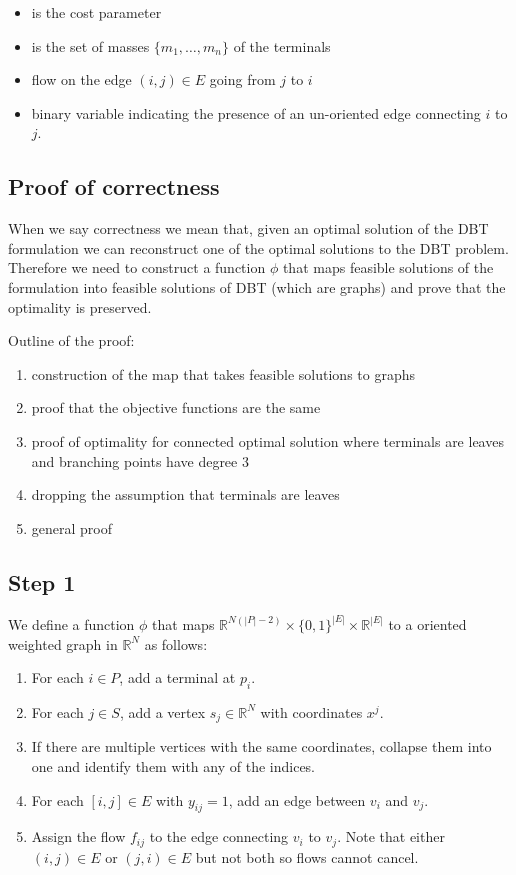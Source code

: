 \documentclass[11pt,reqno,a4paper]{amsart}
\newenvironment{itemizeb}
{\begin{itemize}
     \itemsep=2pt}{
\end{itemize}}
\numberwithin{equation}{section}
\theoremstyle{mytheorem}
\theoremstyle{myremark}
\theoremstyle{myparagraph}
\newcommand{\R}{\mathbb{R}}
\begin{document}
    \begin{itemizeb}
         cm=.3 cm
        \item[$\alpha \in (0,1)$] is the cost parameter
        \item [$M$] is the set of masses $\{m_1, \ldots, m_n\}$ of the terminals
        \item [$f_{ij}$] flow on the edge $(i, j) \in E$ going from $j$ to $i$
        \item [$y_{ij}$] binary variable indicating the presence of an un-oriented edge connecting $i$ to $j$.
    \end{itemizeb}

    \subsection{Proof of correctness}

    When we say correctness we mean that, given an optimal solution of the DBT formulation we can reconstruct one of the optimal solutions
    to the DBT problem.
    Therefore we need to construct a function $\phi$ that maps feasible solutions of the formulation into feasible solutions of DBT (which are graphs)
    and prove that the optimality is preserved.

    Outline of the proof:
    \begin{enumerate}
        \item construction of the map that takes feasible solutions to graphs
        \item proof that the objective functions are the same
        \item proof of optimality for connected optimal solution where terminals are leaves and branching points have degree 3
        \item dropping the assumption that terminals are leaves
        \item general proof
    \end{enumerate}

    \subsection{Step 1}
    We define a function $\phi$ that maps $\mathbb{R}^{N (|P|-2)} \times \{0,1\}^{|E|} \times \R^{|E|}$ to a oriented weighted graph in $\mathbb{R}^N$ as follows:

    \begin{enumerate}
        \item For each $i \in P$, add a terminal at $p_i$.
        \item For each $j \in S$, add a vertex $s_j \in \R^N$ with coordinates $x^j$.
        \item If there are multiple vertices with the same coordinates, collapse them into one and identify them with any of the indices.
        \item For each $[i,j] \in E$ with $y_{ij} = 1$, add an edge between $v_i$ and $v_j$.
        \item Assign the flow $f_{ij}$ to the edge connecting $v_i$ to $v_j$. Note that either $(i,j) \in E$ or $(j,i) \in E$ but not both so flows
        cannot cancel.
    \end{enumerate}
\end{document}

